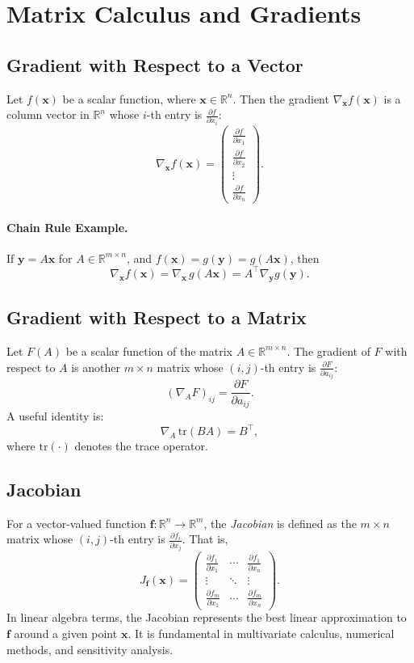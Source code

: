\section{Matrix Calculus and Gradients}

\subsection{Gradient with Respect to a Vector}
Let $f(\mathbf{x})$ be a scalar function, where $\mathbf{x} \in \mathbb{R}^n$. Then the gradient 
$\nabla_{\mathbf{x}} f(\mathbf{x})$ is a column vector in $\mathbb{R}^n$ whose $i$-th entry is 
$\frac{\partial f}{\partial x_i}$:
\[
\nabla_{\mathbf{x}} f(\mathbf{x}) 
= \begin{pmatrix}
\frac{\partial f}{\partial x_1} \\
\frac{\partial f}{\partial x_2} \\
\vdots \\
\frac{\partial f}{\partial x_n}
\end{pmatrix}.
\]

\paragraph{Chain Rule Example.}
If $\mathbf{y} = A \mathbf{x}$ for $A \in \mathbb{R}^{m \times n}$, and $f(\mathbf{x}) = g(\mathbf{y}) = g(A\mathbf{x})$, then
\[
\nabla_{\mathbf{x}} f(\mathbf{x}) 
= \nabla_{\mathbf{x}} \, g(A\mathbf{x}) 
= A^\top \nabla_{\mathbf{y}} g(\mathbf{y}).
\]

\subsection{Gradient with Respect to a Matrix}
Let $F(A)$ be a scalar function of the matrix $A \in \mathbb{R}^{m \times n}$. 
The gradient of $F$ with respect to $A$ is another $m \times n$ matrix whose $(i,j)$-th entry is 
$\frac{\partial F}{\partial a_{ij}}$:
\[
(\nabla_A F)_{ij} = \frac{\partial F}{\partial a_{ij}}.
\]
A useful identity is:
\[
\nabla_A \, \mathrm{tr}(BA) = B^\top,
\]
where $\mathrm{tr}(\cdot)$ denotes the trace operator.

\subsection{Jacobian}
For a vector-valued function $\mathbf{f} : \mathbb{R}^n \to \mathbb{R}^m$, the \emph{Jacobian} 
is defined as the $m \times n$ matrix whose $(i, j)$-th entry is 
\(
\frac{\partial f_i}{\partial x_j}.
\)
That is,
\[
J_{\mathbf{f}}(\mathbf{x}) 
= \begin{pmatrix}
\frac{\partial f_1}{\partial x_1} & \cdots & \frac{\partial f_1}{\partial x_n} \\
\vdots & \ddots & \vdots \\
\frac{\partial f_m}{\partial x_1} & \cdots & \frac{\partial f_m}{\partial x_n}
\end{pmatrix}.
\]
In linear algebra terms, the Jacobian represents the best linear approximation to $\mathbf{f}$ around 
a given point $\mathbf{x}$. It is fundamental in multivariate calculus, numerical methods, and 
sensitivity analysis.

